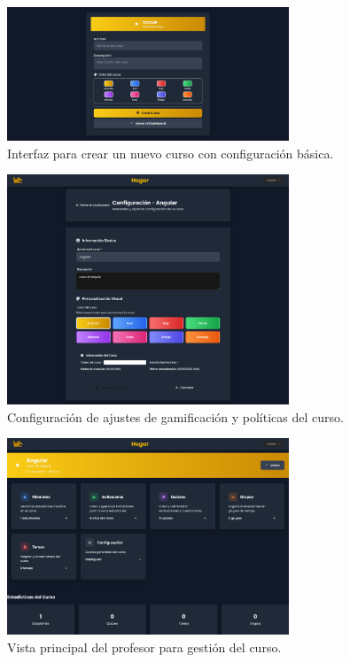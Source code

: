 \begin{figure}[H]
	\centering
	\includegraphics[width=0.75\textwidth]{images/pagina_web_crear-una-clase.jpg}
	\caption{Interfaz para crear un nuevo curso con configuración básica.}
	\label{fig:manual-crear-curso}
\end{figure}

\begin{figure}[H]
	\centering
	\includegraphics[width=0.75\textwidth]{images/pagina_web_configuracion-de-la.clase.jpg}
	\caption{Configuración de ajustes de gamificación y políticas del curso.}
	\label{fig:manual-config-curso}
\end{figure}

\begin{figure}[H]
	\centering
	\includegraphics[width=0.75\textwidth]{images/pagina_web_vista-profesor-clase.jpg}
	\caption{Vista principal del profesor para gestión del curso.}
	\label{fig:manual-vista-profesor}
\end{figure}

